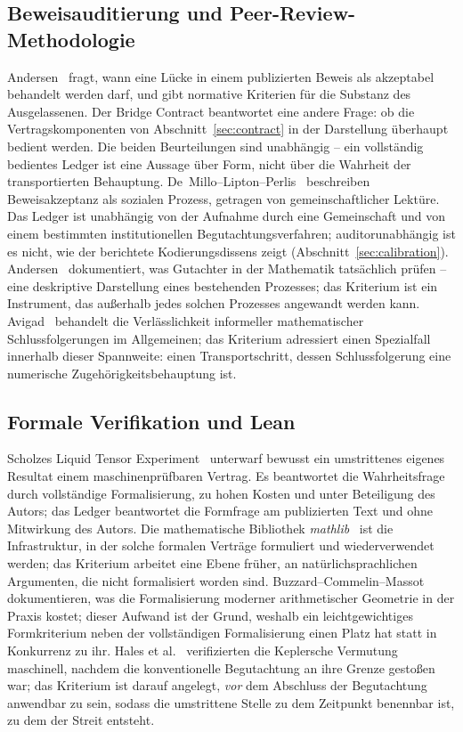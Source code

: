 \documentclass[11pt,a4paper]{article}
\begin{document}
\subsection{Beweisauditierung und Peer-Review-Methodologie}\label{sec:related-audit}

Andersen~\cite{Andersen2020} fragt, wann eine Lücke in einem publizierten
Beweis als akzeptabel behandelt werden darf, und gibt normative Kriterien für
die Substanz des Ausgelassenen. Der Bridge Contract beantwortet eine andere
Frage: ob die Vertragskomponenten von Abschnitt~\ref{sec:contract} in der
Darstellung überhaupt bedient werden. Die beiden Beurteilungen sind
unabhängig -- ein vollständig bedientes Ledger ist eine Aussage über Form,
nicht über die Wahrheit der transportierten Behauptung.
De~Millo--Lipton--Perlis~\cite{DeMillo1979} beschreiben Beweisakzeptanz als
sozialen Prozess, getragen von gemeinschaftlicher Lektüre. Das Ledger ist
unabhängig von der Aufnahme durch eine Gemeinschaft und von einem bestimmten
institutionellen Begutachtungsverfahren; auditorunabhängig ist es nicht, wie
der berichtete Kodierungsdissens zeigt
(Abschnitt~\ref{sec:calibration}). Andersen~\cite{Andersen2017} dokumentiert,
was Gutachter in der Mathematik tatsächlich prüfen -- eine deskriptive
Darstellung eines bestehenden Prozesses; das Kriterium ist ein Instrument,
das außerhalb jedes solchen Prozesses angewandt werden kann.
Avigad~\cite{Avigad2021} behandelt die Verlässlichkeit informeller
mathematischer Schlussfolgerungen im Allgemeinen; das Kriterium adressiert
einen Spezialfall innerhalb dieser Spannweite: einen Transportschritt, dessen
Schlussfolgerung eine numerische Zugehörigkeitsbehauptung ist.

\subsection{Formale Verifikation und Lean}\label{sec:related-formal}

Scholzes Liquid Tensor Experiment~\cite{Scholze2022LTE} unterwarf bewusst ein
umstrittenes eigenes Resultat einem maschinenprüfbaren Vertrag. Es beantwortet
die Wahrheitsfrage durch vollständige Formalisierung, zu hohen Kosten und
unter Beteiligung des Autors; das Ledger beantwortet die Formfrage am
publizierten Text und ohne Mitwirkung des Autors. Die mathematische Bibliothek
\emph{mathlib}~\cite{Mathlib2020} ist die Infrastruktur, in der solche
formalen Verträge formuliert und wiederverwendet werden; das Kriterium
arbeitet eine Ebene früher, an natürlichsprachlichen Argumenten, die nicht
formalisiert worden sind.
Buzzard--Commelin--Massot~\cite{Buzzard2020} dokumentieren, was die
Formalisierung moderner arithmetischer Geometrie in der Praxis kostet; dieser
Aufwand ist der Grund, weshalb ein leichtgewichtiges Formkriterium neben der
vollständigen Formalisierung einen Platz hat statt in Konkurrenz zu ihr.
Hales et al.~\cite{Hales2017} verifizierten die Keplersche Vermutung
maschinell, nachdem die konventionelle Begutachtung an ihre Grenze gestoßen
war; das Kriterium ist darauf angelegt, \emph{vor} dem Abschluss der
Begutachtung anwendbar zu sein, sodass die umstrittene Stelle zu dem
Zeitpunkt benennbar ist, zu dem der Streit entsteht.
\end{document}

